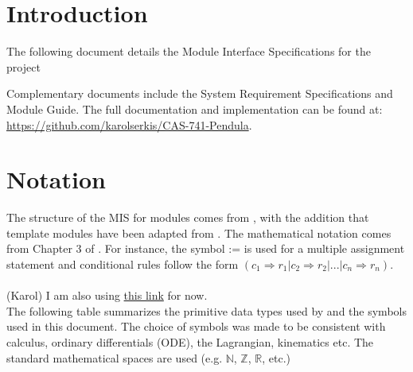 \documentclass[12pt, titlepage]{article}
\begin{document}
\newpage

\tableofcontents

\newpage


\section{Introduction}

The following document details the Module Interface Specifications for the 
\progname project

Complementary documents include the System Requirement Specifications
and Module Guide. The full documentation and implementation can be
found at: \\\url{https://github.com/karolserkis/CAS-741-Pendula}.  

\section{Notation}

  

The structure of the MIS for modules comes from \citet{HoffmanAndStrooper1995},
with the addition that template modules have been adapted from
\cite{GhezziEtAl2003}.  The mathematical notation comes 
from Chapter 3 of \citet{HoffmanAndStrooper1995}.  
For instance, the symbol := is used for a multiple assignment statement and 
conditional rules follow the form 
$(c_1 \Rightarrow r_1 | c_2 \Rightarrow r_2 | ... | c_n \Rightarrow r_n )$.\\\\
(Karol) I am also using \href{https://proofwiki.org/wiki/Symbols:R}{this link}
for now.\\

The following table summarizes the primitive data types used by \progname and 
the symbols used in this document.
The choice of symbols was made to be consistent with calculus, ordinary
differentials (ODE), the Lagrangian, kinematics etc. The standard mathematical
spaces are used (e.g. $\mathbb{N}$, $\mathbb{Z}$, $\mathbb{R}$, etc.)
\end{document}
